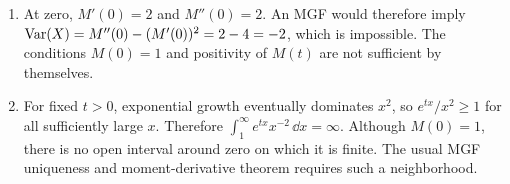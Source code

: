 \begin{enumerate}[label=\textbf{D\arabic*.},leftmargin=*,itemsep=1em]
\[\]
The original mean and variance are both $1$, so $\E[W]=3-2=1$ and $\Var(W)=(-2)^2=4$. The domain reverses direction because the scale coefficient is negative.
\item At zero, $M'(0)=2$ and $M''(0)=2$. An MGF would therefore imply $\operatorname{Var}(X)=M''(0)-(M'(0))^2=2-4=-2$, which is impossible. The conditions $M(0)=1$ and positivity of $M(t)$ are not sufficient by themselves.
\item For fixed $t>0$, exponential growth eventually dominates $x^2$, so $e^{tx}/x^2\geq1$ for all sufficiently large $x$. Therefore $\int_1^\infty e^{tx}x^{-2}\,\dd x=\infty$. Although $M(0)=1$, there is no open interval around zero on which it is finite. The usual MGF uniqueness and moment-derivative theorem requires such a neighborhood.
\end{enumerate}

